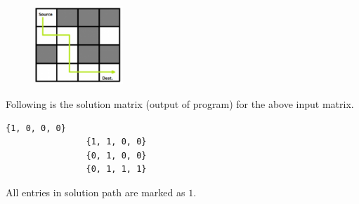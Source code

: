 \begin{figure}
\centering
\includegraphics[width=0.3\textwidth]{Images/figGFGBkTSet2RatMaze2}
\end{figure}

Following is the solution matrix (output of program) for the above input
matrix.
\begin{lstlisting}[style=raygeneric]
                {1, 0, 0, 0}
                {1, 1, 0, 0}
                {0, 1, 0, 0}
                {0, 1, 1, 1}
\end{lstlisting}
All entries in solution path are marked as $1$.

\textbf{}

\RayNotesBegin

